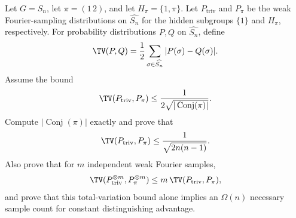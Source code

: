 Let $G=S_n$, let $\pi=(1\,2)$, and let $H_\pi=\{1,\pi\}$.  Let $P_{\mathrm{triv}}$ and $P_\pi$ be the weak Fourier-sampling distributions on $\widehat{S_n}$ for the hidden subgroups $\{1\}$ and $H_\pi$, respectively.  For probability distributions $P,Q$ on $\widehat{S_n}$, define
$$
    \TV(P,Q)=\frac12\sum_{\sigma\in\widehat{S_n}}|P(\sigma)-Q(\sigma)|.
$$
Assume the bound
$$
    \TV(P_{\mathrm{triv}},P_\pi)
    \leq \frac{1}{2\sqrt{|\operatorname{Conj}(\pi)|}}.
$$
Compute $|\operatorname{Conj}(\pi)|$ exactly and prove that
$$
    \TV(P_{\mathrm{triv}},P_\pi)
    \leq \frac1{\sqrt{2n(n-1)}}.
$$
Also prove that for $m$ independent weak Fourier samples,
$$
    \TV(P_{\mathrm{triv}}^{\otimes m},P_\pi^{\otimes m})
    \leq m\,\TV(P_{\mathrm{triv}},P_\pi),
$$
and prove that this total-variation bound alone implies an $\Omega(n)$ necessary sample count for constant distinguishing advantage.
